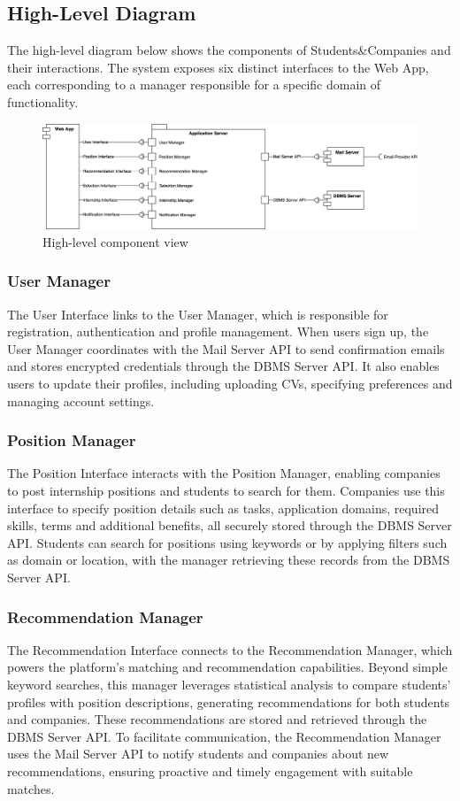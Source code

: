 \subsection{High-Level Diagram}
The high-level diagram below shows the components of Students\&Companies and their interactions.
The system exposes six distinct interfaces to the Web App, each corresponding to a manager responsible for a specific domain of functionality.

\begin{figure}[h]
    \centering
    \includegraphics[width=16cm]{images/component-view/high-level.png}
    \caption{High-level component view}
\end{figure}

\subsubsection{User Manager}
The User Interface links to the User Manager, which is responsible for registration, authentication and profile management.
When users sign up, the User Manager coordinates with the Mail Server API to send confirmation emails and stores encrypted credentials through the DBMS Server API.
It also enables users to update their profiles, including uploading CVs, specifying preferences and managing account settings.

\subsubsection{Position Manager}
The Position Interface interacts with the Position Manager, enabling companies to post internship positions and students to search for them.
Companies use this interface to specify position details such as tasks, application domains, required skills, terms and additional benefits, all securely stored through the DBMS Server API.
Students can search for positions using keywords or by applying filters such as domain or location, with the manager retrieving these records from the DBMS Server API.

\subsubsection{Recommendation Manager}
The Recommendation Interface connects to the Recommendation Manager, which powers the platform's matching and recommendation capabilities.
Beyond simple keyword searches, this manager leverages statistical analysis to compare students' profiles with position descriptions, generating recommendations for both students and companies.
These recommendations are stored and retrieved through the DBMS Server API.
To facilitate communication, the Recommendation Manager uses the Mail Server API to notify students and companies about new recommendations, ensuring proactive and timely engagement with suitable matches.

